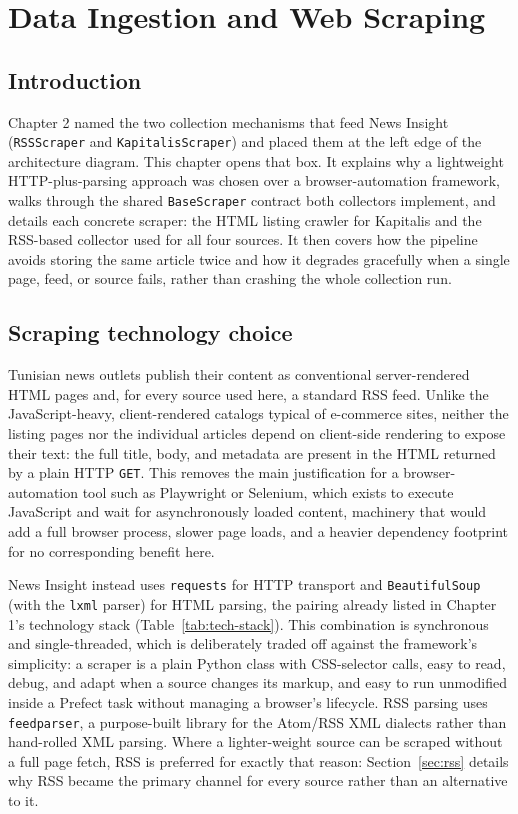 \chapter{Data Ingestion and Web Scraping}

\section{Introduction}
Chapter 2 named the two collection mechanisms that feed News Insight (\texttt{RSSScraper} and \texttt{Kapitalis\allowbreak Scraper}) and placed them at the left edge of the architecture diagram. This chapter opens that box. It explains why a lightweight HTTP-plus-parsing approach was chosen over a browser-automation framework, walks through the shared \texttt{BaseScraper} contract both collectors implement, and details each concrete scraper: the HTML listing crawler for Kapitalis and the RSS-based collector used for all four sources. It then covers how the pipeline avoids storing the same article twice and how it degrades gracefully when a single page, feed, or source fails, rather than crashing the whole collection run.

\section{Scraping technology choice}
\label{sec:scrape-tech}
Tunisian news outlets publish their content as conventional server-rendered HTML pages and, for every source used here, a standard RSS feed. Unlike the JavaScript-heavy, client-rendered catalogs typical of e-commerce sites, neither the listing pages nor the individual articles depend on client-side rendering to expose their text: the full title, body, and metadata are present in the HTML returned by a plain HTTP \texttt{GET}. This removes the main justification for a browser-automation tool such as Playwright or Selenium, which exists to execute JavaScript and wait for asynchronously loaded content, machinery that would add a full browser process, slower page loads, and a heavier dependency footprint for no corresponding benefit here.

News Insight instead uses \texttt{requests} for HTTP transport and \texttt{BeautifulSoup} (with the \texttt{lxml} parser) for HTML parsing, the pairing already listed in Chapter 1's technology stack (Table~\ref{tab:tech-stack}). This combination is synchronous and single-threaded, which is deliberately traded off against the framework's simplicity: a scraper is a plain Python class with CSS-selector calls, easy to read, debug, and adapt when a source changes its markup, and easy to run unmodified inside a Prefect task without managing a browser's lifecycle. RSS parsing uses \texttt{feedparser}, a purpose-built library for the Atom/RSS XML dialects rather than hand-rolled XML parsing. Where a lighter-weight source can be scraped without a full page fetch, RSS is preferred for exactly that reason: Section~\ref{sec:rss} details why RSS became the primary channel for every source rather than an alternative to it.

